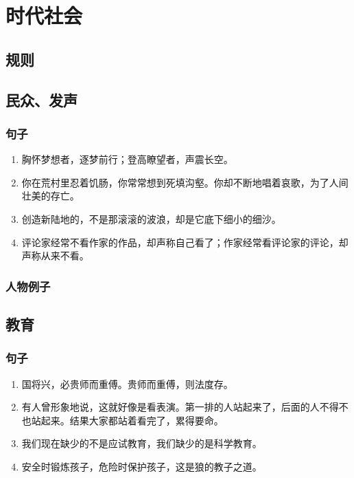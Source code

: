 \chapter{时代社会}

\section{规则}

\section{民众、发声}
\subsection{句子}
\begin{enumerate}
\item 胸怀梦想者，逐梦前行；登高瞭望者，声震长空。
\item 你在荒村里忍着饥肠，你常常想到死填沟壑。你却不断地唱着哀歌，为了人间壮美的存亡。
\item 创造新陆地的，不是那滚滚的波浪，却是它底下细小的细沙。
\item 评论家经常不看作家的作品，却声称自己看了；作家经常看评论家的评论，却声称从来不看。
\end{enumerate}
\subsection{人物例子}


\section{教育}
\subsection{句子}
\begin{enumerate}
\item 国将兴，必贵师而重傅。贵师而重傅，则法度存。
\item 有人曾形象地说，这就好像是看表演。第一排的人站起来了，后面的人不得不也站起来。结果大家都站着看完了，累得要命。
\item 我们现在缺少的不是应试教育，我们缺少的是科学教育。
\item 安全时锻炼孩子，危险时保护孩子，这是狼的教子之道。
\end{enumerate}
